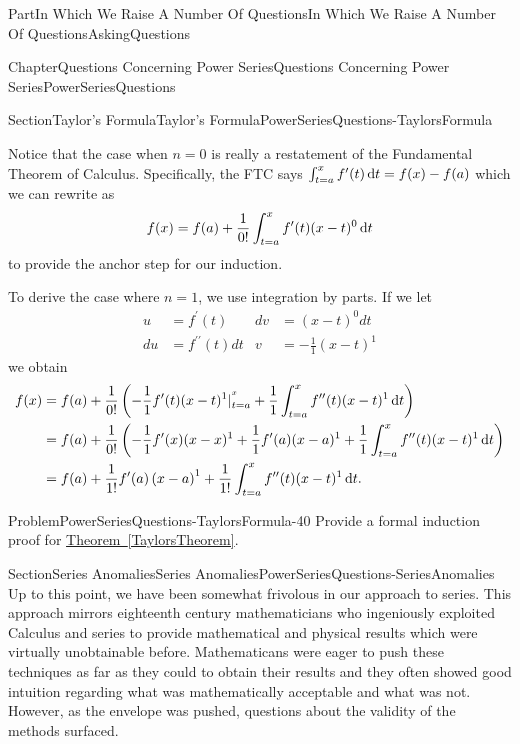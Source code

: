 \documentclass[oneside,10pt,]{book}
\newcommand{\xreffont}{\relax}
\numberwithin{equation}{part}
\newcommand{\dx}[1]{\,{\rm d}#1}
\newcommand{\amp}{&}
\begin{document}
\begin{partptx}{Part}{In Which We Raise A Number Of Questions}{}{In Which We Raise A Number Of Questions}{}{}{AskingQuestions}
\begin{chapterptx}{Chapter}{Questions Concerning Power Series}{}{Questions Concerning Power Series}{}{}{PowerSeriesQuestions}
\begin{sectionptx}{Section}{Taylor's Formula}{}{Taylor's Formula}{}{}{PowerSeriesQuestions-TaylorsFormula}
\par
Notice that the case when \(n=0\) is really a restatement of the Fundamental Theorem of Calculus. Specifically, the FTC says \(\int_{t=a}^xf^\prime(t)\dx{ t}=f(x)-f(a)\) which we can rewrite as%
\begin{equation*}
f(x)=f(a)+\frac{1}{0!}\int_{t=a}^xf^\prime(t)(x-t)^0\dx{ t}
\end{equation*}
to provide the anchor step for our induction.%
\par
To derive the case where \(n=1\), we use integration by parts. If we let%
\begin{align*}
u\amp =f^\prime(t)\amp  d v\amp =(x-t)^0d t\\
d u\amp =f^{\prime\prime}(t)d t\amp  v\amp =-\frac{1}{1}(x-t)^1
\end{align*}
we obtain%
\begin{align*}
f(x)\amp =f(a)+\frac{1}{0!}\left(-\frac{1}{1}f^\prime(t)(x-t)^1|_{t=a}^{^x}+\frac{1}{1} \int_{t=a}^xf^{\prime\prime}(t)(x-t)^1\dx{ t}\right)\\
\amp =f(a)+\frac{1}{0!}\left(-\frac{1}{1}f^\prime(x)(x-x)^1+ \frac{1}{1}f^\prime(a)(x-a)^1+\frac{1}{1}\int_{t=a}^xf^{\prime\prime}(t)(x-t)^1\dx{ t}\right)\\
\amp =f(a)+\frac{1}{1!}f^\prime(a)\left(x-a\right)^1 + \frac{1}{1!}\int_{t=a}^xf^{\prime\prime}(t)(x-t)^1\dx{ t}\text{.}
\end{align*}
%
\begin{problem}{Problem}{}{PowerSeriesQuestions-TaylorsFormula-40}%
 Provide a formal induction proof for \hyperref[TaylorsTheorem]{Theorem~{\xreffont\ref{TaylorsTheorem}}}.%
\end{problem}
\end{sectionptx}
%
%
\typeout{************************************************}
\typeout{************************************************}
%
\begin{sectionptx}{Section}{Series Anomalies}{}{Series Anomalies}{}{}{PowerSeriesQuestions-SeriesAnomalies}
Up to this point, we have been somewhat frivolous in our approach to series.  This approach mirrors eighteenth century mathematicians who ingeniously exploited Calculus and series to provide mathematical and physical results which were virtually unobtainable before.  Mathematicans were eager to push these techniques as far as they could to obtain their results and they often showed good intuition regarding what was mathematically acceptable and what was not.  However, as the envelope was pushed, questions about the validity of the methods surfaced.%

\end{sectionptx}
\end{chapterptx}
\end{partptx}
\end{document}
